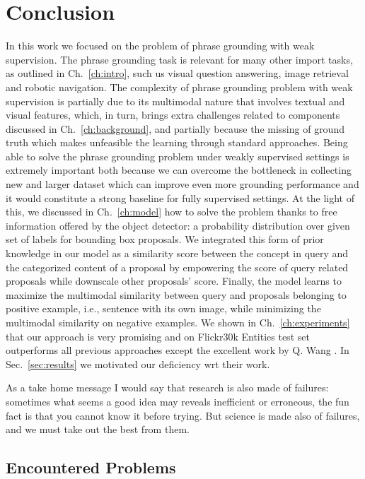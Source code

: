\chapter{Conclusion}
\label{conclusion}

In this work we focused on the problem of phrase grounding with weak
supervision. The phrase grounding task is relevant for many other
import tasks, as outlined in Ch.~\ref{ch:intro}, such us visual
question answering, image retrieval and robotic navigation. The
complexity of phrase grounding problem with weak supervision is
partially due to its multimodal nature that involves textual and
visual features, which, in turn, brings extra challenges related to
components discussed in Ch.~\ref{ch:background}, and partially because
the missing of ground truth which makes unfeasible the learning
through standard approaches. Being able to solve the phrase grounding
problem under weakly supervised settings is extremely important both
because we can overcome the bottleneck in collecting new and larger
dataset which can improve even more grounding performance and it would
constitute a strong baseline for fully supervised settings. At the
light of this, we discussed in Ch.~\ref{ch:model} how to solve the
problem thanks to free information offered by the object detector: a
probability distribution over given set of labels for bounding box
proposals. We integrated this form of prior knowledge in our model as
a similarity score between the concept in query and the categorized
content of a proposal by empowering the score of query related
proposals while downscale other proposals' score. Finally, the model
learns to maximize the multimodal similarity between query and
proposals belonging to positive example, i.e., sentence with its own
image, while minimizing the multimodal similarity on negative
examples. We shown in Ch.~\ref{ch:experiments} that our approach is
very promising and on Flickr30k Entities test set outperforms all
previous approaches except the excellent work by Q. Wang \etal{}
\cite{wang2020maf}. In Sec.~\ref{sec:results} we motivated our
deficiency wrt their work.

As a take home message I would say that research is also made of
failures: sometimes what seems a good idea may reveals inefficient or
erroneous, the fun fact is that you cannot know it before trying. But
science is made also of failures, and we must take out the best from
them.

\section{Encountered Problems}

